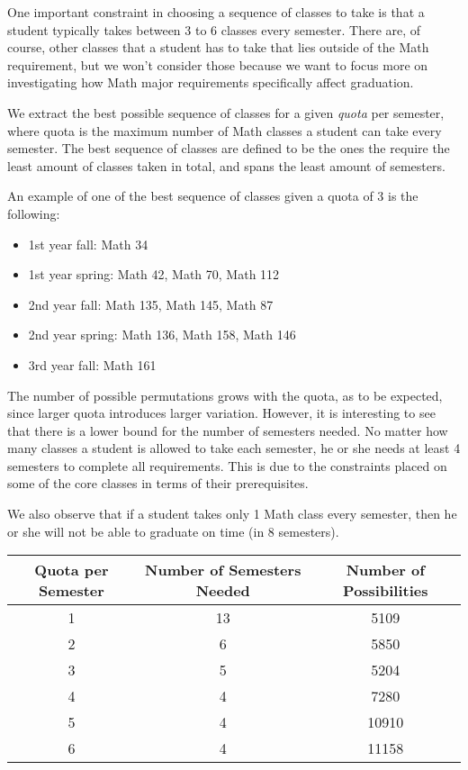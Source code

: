 \documentclass[12pt, oneside]{article}
\begin{document}
\bigskip


One important constraint in choosing a sequence of classes to take is that a student typically takes between 3 to 6 classes every semester. There are, of course, other classes that a student has to take that lies outside of the Math requirement, but we won't consider those because we want to focus more on investigating how Math major requirements specifically affect graduation.

\bigskip


We extract the best possible sequence of classes for a given \textit{quota} per semester, where quota is the maximum number of Math classes a student can take every semester. The best sequence of classes are defined to be the ones the require the least amount of classes taken in total, and spans the least amount of semesters. 

\bigskip


An example of one of the best sequence of classes given a quota of 3 is the following:
    \begin{itemize}
    \item 1st year fall: Math 34
    \item 1st year spring: Math 42, Math 70, Math 112
    \item 2nd year fall: Math 135, Math 145, Math 87
    \item 2nd year spring: Math 136, Math 158, Math 146
    \item 3rd year fall: Math 161
    \end{itemize}

\bigskip


The number of possible permutations grows with the quota, as to be expected, since larger quota introduces larger variation. However, it is interesting to see that there is a lower bound for the number of semesters needed. No matter how many classes a student is allowed to take each semester, he or she needs at least 4 semesters to complete all requirements. This is due to the constraints placed on some of the core classes in terms of their prerequisites.

\bigskip


We also observe that if a student takes only 1 Math class every semester, then he or she will not be able to graduate on time (in 8 semesters).

\begin{center}
    \begin{tabular}{c | c | c}
        \toprule
        Quota per Semester & Number of Semesters Needed & Number of Possibilities \\
        \midrule
        1 & 13 &5109 \\
        2 & 6 & 5850 \\ 
        3 & 5 & 5204 \\
        4 & 4 & 7280 \\
        5 & 4 & 10910 \\
        6 & 4 & 11158 \\
        \bottomrule
    \end{tabular}
\end{center}
\end{document}
